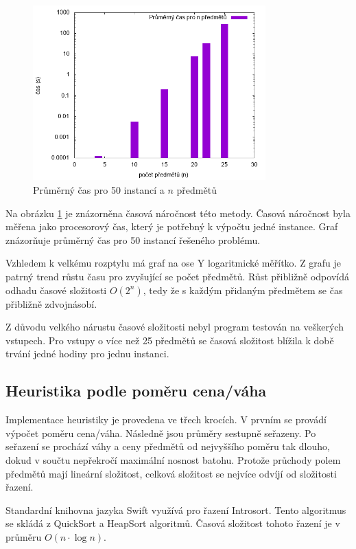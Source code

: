 \documentclass{article}
\begin{document}
\begin{figure}[h]
    \centering
    \includegraphics[width=0.8\textwidth]{all-cases-duration.png}
    \caption{Průměrný čas pro 50 instancí a $n$ předmětů}
    \label{fig:g1}
\end{figure}

Na obrázku \ref{fig:g1} je znázorněna časová náročnost této metody.
Časová náročnost byla měřena jako procesorový čas, který je potřebný k výpočtu jedné instance.
Graf znázorňuje průměrný čas pro 50 instancí řešeného problému.

Vzhledem k velkému rozptylu má graf na ose Y logaritmické měřítko.
Z grafu je patrný trend růstu času pro zvyšující se počet předmětů.
Růst přibližně odpovídá odhadu časové složitosti $O(2^n)$, tedy že s každým přidaným předmětem se čas přibližně zdvojnásobí.

Z důvodu velkého nárustu časové složitosti nebyl program testován na veškerých vstupech.
Pro vstupy o více než 25 předmětů se časová složitost blížila k době trvání jedné hodiny pro jednu instanci. 

\subsection*{Heuristika podle poměru cena/váha}

Implementace heuristiky je provedena ve třech krocích.
V prvním se provádí výpočet poměru cena/váha.
Následně jsou průměry sestupně seřazeny.
Po seřazení se prochází váhy a ceny předmětů od nejvyššího poměru tak dlouho, dokud v součtu nepřekročí maximální nosnost batohu.
Protože průchody polem předmětů mají lineární složitost, celková složitost se nejvíce odvíjí od složitosti řazení.

Standardní knihovna jazyka Swift využívá pro řazení Introsort\citep{swift-introsort}.
Tento algoritmus se skládá z QuickSort a HeapSort\citep{wiki-introsort} algoritmů.
Časová složitost tohoto řazení je v průměru $O(n \cdot \log n)$.
\end{document}
